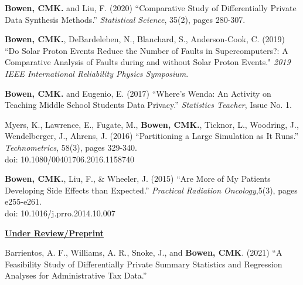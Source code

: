 \documentclass[11pt, letterpaper, roman]{moderncv} %
\begin{document}
\begin{etaremune}[topsep=0pt, itemsep=2pt, partopsep=0pt, parsep=0pt]
    \item \textbf{Bowen, CMK.} and Liu, F. (2020) ``Comparative Study of Differentially Private Data Synthesis Methods.'' \textit{Statistical Science}, 35(2), pages 280-307.

    \item \textbf{Bowen, CMK.}, DeBardeleben, N., Blanchard, S., Anderson-Cook, C. (2019) ``Do Solar Proton Events Reduce the Number of Faults in Supercomputers?: A Comparative Analysis of Faults during and without Solar Proton Events." \textit{2019 IEEE International Reliability Physics Symposium}.

    \item \textbf{Bowen, CMK.} and Eugenio, E. (2017) ``Where's Wenda:  An Activity on Teaching Middle School Students Data Privacy.'' \textit{Statistics Teacher}, Issue No. 1.
    
    \item Myers, K., Lawrence, E., Fugate, M., \textbf{Bowen, CMK.}, Ticknor, L., Woodring, J., Wendelberger, J., Ahrens, J. (2016) ``Partitioning a Large Simulation as It Runs.'' \textit{Technometrics}, 58(3), pages 329-340. \\
    doi: 10.1080/00401706.2016.1158740

    \item \textbf{Bowen, CMK.}, Liu, F., \& Wheeler, J. (2015) ``Are More of My Patients Developing Side Effects than Expected.'' \textit{Practical Radiation Oncology},5(3), pages e255-e261.\\
    doi: 10.1016/j.prro.2014.10.007
\end{etaremune}

\vspace{4pt}
\noindent\underline{\textbf{Under Review/Preprint}}
\begin{etaremune}[topsep=0pt, itemsep=6pt, partopsep=0pt, parsep=0pt]
    \item Barrientos, A. F., Williams, A. R., Snoke, J., and \textbf{Bowen, CMK}. (2021) ``A Feasibility Study of Differentially Private Summary Statistics and Regression Analyses for Administrative Tax Data.''
\end{etaremune}
\end{document}
